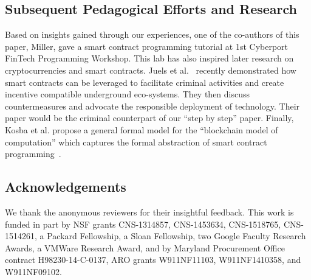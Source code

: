 \documentclass{llncs}
\renewcommand{\paragraph}[1]{\vspace{5pt} \noindent{\bf #1}}
\begin{document}
\subsection{Subsequent Pedagogical Efforts and Research}
Based on insights gained through our experiences, 
one of the co-authors of this paper, Miller,  
gave a smart contract programming 
tutorial 
at 1st Cyberport FinTech Programming Workshop. 
%
%
This lab has also inspired later research 
on cryptocurrencies and smart contracts.
Juels et al.~\cite{crime} recently 
demonstrated how smart contracts can be leveraged to facilitate 
criminal activities 
and create incentive compatible underground eco-systems.
They then discuss countermeasures and advocate the responsible deployment
of technology. 
Their paper would be the criminal counterpart  
of our ``step by step'' paper.
%
Finally, Kosba et al.
propose a general formal model for the ``blockchain  
model of computation'' which captures the formal abstraction
of smart contract programming~\cite{hawk}.
%
%

\subsection{Acknowledgements}
We thank the anonymous reviewers for their insightful
feedback. This work is funded in part by NSF grants CNS-1314857, CNS-1453634, CNS-1518765, CNS-1514261, a Packard Fellowship, a Sloan Fellowship, two Google Faculty Research Awards, a VMWare Research Award, and by Maryland Procurement Office contract H98230-14-C-0137, ARO grants W911NF11103, W911NF1410358, and W911NF09102.






\end{document}
